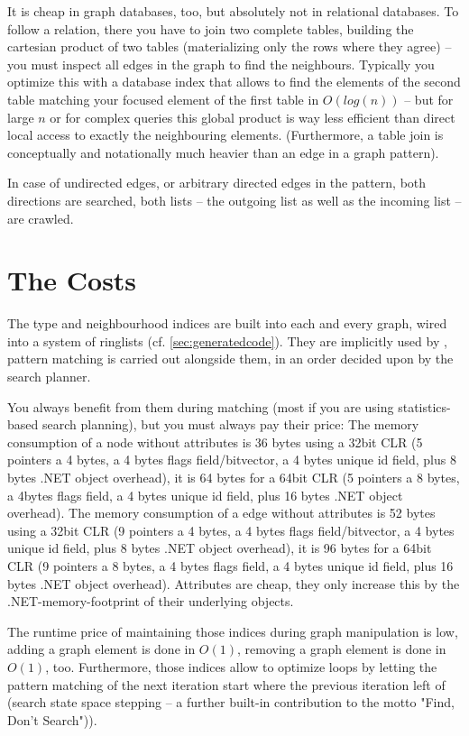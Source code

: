 It is cheap in graph databases, too, but absolutely not in relational databases.
To follow a relation, there you have to join two complete tables, building the cartesian product of two tables (materializing only the rows where they agree) -- you must inspect all edges in the graph to find the neighbours.
Typically you optimize this with a database index that allows to find the elements of the second table matching your focused element of the first table in $O(log(n))$ -- but for large $n$ or for complex queries this global product is way less efficient than direct local access to exactly the neighbouring elements.
(Furthermore, a table join is conceptually and notationally much heavier than an edge in a graph pattern).

In case of undirected edges, or arbitrary directed edges in the pattern, both directions are searched,
both lists -- the outgoing list as well as the incoming list -- are crawled.

\section{The Costs}\label{sec:performancememory} 
The type and neighbourhood indices are built into each and every \GrG{} graph, wired into a system of ringlists (cf. \ref{sec:generatedcode}).
They are implicitly used by \GrG{}, pattern matching is carried out alongside them, in an order decided upon by the search planner. 

You always benefit from them during matching (most if you are using statistics-based search planning), but you must always pay their price:
The memory consumption of a \GrG{} node without attributes is 36 bytes using a 32bit CLR (5 pointers a 4 bytes, a 4 bytes flags field/bitvector, a 4 bytes unique id field, plus 8 bytes .NET object overhead), it is 64 bytes for a 64bit CLR (5 pointers a 8 bytes, a 4bytes flags field, a 4 bytes unique id field, plus 16 bytes .NET object overhead).
The memory consumption of a \GrG{} edge without attributes is 52 bytes using a 32bit CLR (9 pointers a 4 bytes, a 4 bytes flags field/bitvector, a 4 bytes unique id field, plus 8 bytes .NET object overhead), it is 96 bytes for a 64bit CLR (9 pointers a 8 bytes, a 4 bytes flags field, a 4 bytes unique id field, plus 16 bytes .NET object overhead).
Attributes are cheap, they only increase this by the .NET-memory-footprint of their underlying objects.

The runtime price of maintaining those indices during graph manipulation is low, adding a graph element is done in $O(1)$, removing a graph element is done in $O(1)$, too. 
Furthermore, those indices allow to optimize loops by letting the pattern matching of the next iteration start where the previous iteration left of (search state space stepping -- a further built-in contribution to the motto "Find, Don't Search")).

